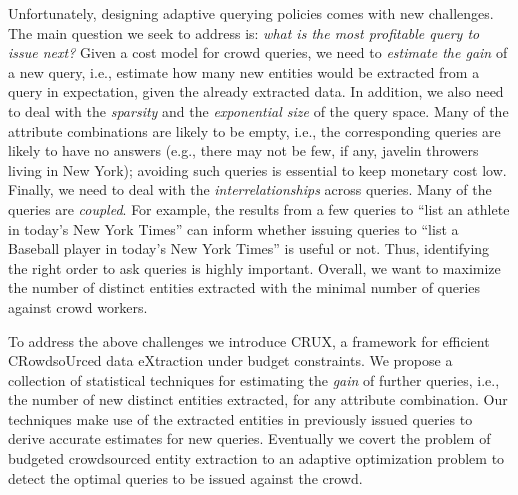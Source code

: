 Unfortunately, designing adaptive querying policies comes with new challenges. The main question we seek to address is: {\em what is the most profitable query to issue next?} Given a cost model for crowd queries, we need to {\em estimate the gain} of a new query, i.e., estimate how many new entities would be extracted from a query in expectation, given the already extracted data. In addition, we also need to deal with the {\em sparsity} and the {\em exponential size} of the query space. Many of the attribute combinations are likely to be empty, i.e., the corresponding queries are likely to have no answers (e.g., there may not be few, if any, javelin throwers living in New York); avoiding such queries is essential to keep monetary cost low. Finally, we need to deal with the {\em interrelationships} across queries. Many of the queries are {\em coupled}. For example, the results from a few queries to ``list an athlete in today's New York Times'' can inform whether issuing queries to ``list a Baseball player in today's New York Times'' is useful or not.  Thus, identifying the right order to ask queries is highly important. Overall, we want to maximize the number of distinct entities extracted with the minimal number of queries against crowd workers. 

To address the above challenges we introduce CRUX, a framework for efficient CRowdsoUrced data eXtraction under budget constraints. We propose a collection of  statistical techniques for estimating the {\em gain} of further queries, i.e., the number of new distinct entities extracted, for any attribute combination. Our techniques make use of the extracted entities in previously issued queries to derive accurate estimates for new queries. Eventually we covert the problem of budgeted crowdsourced entity extraction to an adaptive optimization problem to detect the optimal queries to be issued against the crowd.

